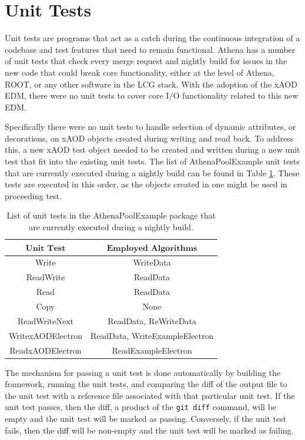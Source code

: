 \section{Unit Tests}
\label{sec:Mod_utests_CI}
Unit tests are programs that act as a catch during the continuous integration of a codebase and test features that need to remain functional. 
Athena has a number of unit tests that check every merge request and nightly build for issues in the new code that could break core functionality, either at the level of Athena, ROOT, or any other software in the LCG stack.
With the adoption of the xAOD EDM, there were no unit tests to cover core I/O functionality related to this new EDM. 

Specifically there were no unit tests to handle selection of dynamic attributes, or decorations, on xAOD objects created during writing and read back.
To address this, a new xAOD test object needed to be created and written during a new unit test that fit into the existing unit tests.
The list of AthenaPoolExample unit tests that are currently executed during a nightly build can be found in Table \ref{tab:CI_Unit_Tests}.
These tests are executed in this order, as the objects created in one might be used in proceeding test.

\begin{table}[h]
    \centering
    \begin{tabular}{|c|c|}
        \hline
        $\textbf{Unit Test}$ & $\textbf{Employed Algorithms}$ \\
        \hline
        Write & WriteData \\
        \hline
        ReadWrite & ReadData \\
        \hline
        Read & ReadData \\
        \hline
        Copy & None \\
        \hline
        ReadWriteNext & ReadData, ReWriteData \\
        \hline
        WritexAODElectron & ReadData, WriteExampleElectron \\
        \hline
        ReadxAODElectron & ReadExampleElectron \\
        \hline
    \end{tabular}
    \caption{List of unit tests in the AthenaPoolExample package that are currently executed during a nightly build.}
    \label{tab:CI_Unit_Tests}
\end{table}

The mechanism for passing a unit test is done automatically by building the framework, running the unit tests, and comparing the diff of the output file to the unit test with a reference file associated with that particular unit test. 
If the unit test passes, then the diff, a product of the \verb|git diff| command, will be empty and the unit test will be marked as passing.
Conversely, if the unit test fails, then the diff will be non-empty and the unit test will be marked as failing.

